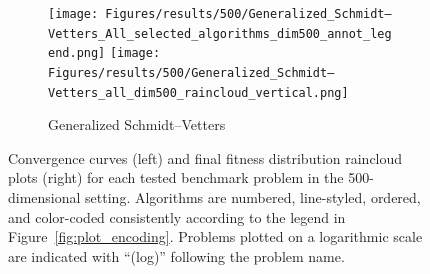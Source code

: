 \begin{figure}[p]
\begin{subfigure}{1\textwidth}
    \centering
    \texttt{[image: Figures/results/500/Generalized\_Schmidt–Vetters\_All\_selected\_algorithms\_dim500\_annot\_legend.png]}
    \texttt{[image: Figures/results/500/Generalized\_Schmidt–Vetters\_all\_dim500\_raincloud\_vertical.png]}
    \caption{Generalized Schmidt–Vetters}
\end{subfigure}

\captionsetup{list=no}
\caption[Convergence curves and final fitness distribution raincloud plots for 500-dimensional problems]{Convergence curves (left) and final fitness distribution raincloud plots (right) for each tested benchmark problem in the 500-dimensional setting. Algorithms are numbered, line-styled, ordered, and color-coded consistently according to the legend in Figure~\ref{fig:plot_encoding}. Problems plotted on a logarithmic scale are indicated with ``(log)'' following the problem name.}
\end{figure}





